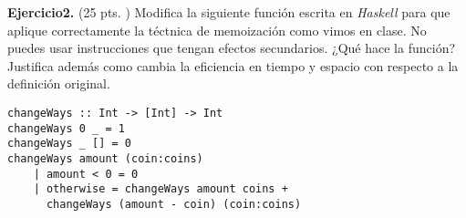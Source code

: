 \textbf{Ejercicio2.} (25 pts. ) Modifica la siguiente función escrita en \textit{Haskell} para que aplique correctamente la téctnica de memoización como vimos en clase. No puedes usar instrucciones que tengan efectos secundarios. ¿Qué hace la función? Justifica además como cambia la eficiencia en tiempo y espacio con respecto a la definición original. \vspace{0.3cm}

\begin{lstlisting}
changeWays :: Int -> [Int] -> Int
changeWays 0 _ = 1
changeWays _ [] = 0
changeWays amount (coin:coins)
    | amount < 0 = 0
    | otherwise = changeWays amount coins + 
      changeWays (amount - coin) (coin:coins)
\end{lstlisting}
